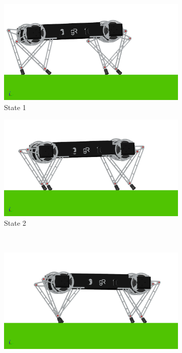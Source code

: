 \documentclass[conference,11pt,letterpaper]{IEEEtran}
\begin{document}
\begin{figure}[t!]
    \centering
    \begin{subfigure}[t]{0.45\linewidth}
        \includegraphics[width=\textwidth]{asymm_snap1}
        \caption{State 1}
    \end{subfigure}%
    \begin{subfigure}[t]{0.45\linewidth}
        \includegraphics[width=\textwidth]{asymm_snap2}
        \caption{State 2}
    \end{subfigure} \\
    \begin{subfigure}[t]{0.45\linewidth}
        \includegraphics[width=\textwidth]{asymm_snap3}

\end{subfigure}
\end{figure}
\end{document}
